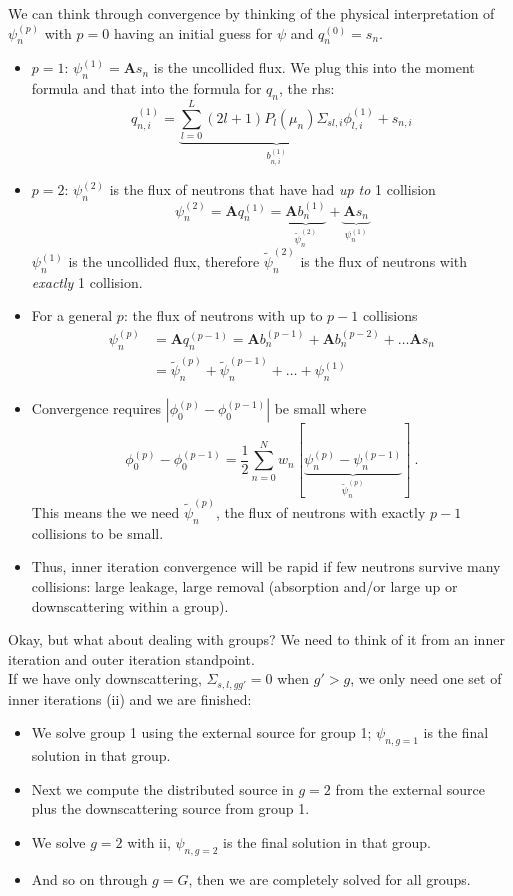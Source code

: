 \documentclass[12pt]{article}
\newcommand{\ve}[1]{\ensuremath{\mathbf{#1}}}
\begin{document}
We can think through convergence by thinking of the physical interpretation of $\psi_n^{(p)}$ with $p=0$ having an initial guess for $\psi$ and $q_n^{(0)} = s_n$.
\begin{itemize}
\item $p=1$: $\psi_n^{(1)} = \ve{A} s_n$ is the uncollided flux. We plug this into the moment formula and that into the formula for $q_n$, the rhs:
\[
q_{n,i}^{(1)} = \underbrace{\sum_{l=0}^L (2l+1) P_l(\mu_n) \Sigma_{sl,i} \phi_{l,i}^{(1)}}_{b_{n,i}^{(1)}} + s_{n,i}
\]

\item  $p=2$: $\psi_n^{(2)}$ is the flux of neutrons that have had \textit{up to} 1 collision
\[
\psi_n^{(2)} = \ve{A} q_{n}^{(1)} = \underbrace{\ve{A} b_n^{(1)}}_{\tilde{\psi}_n^{(2)}} + \underbrace{\ve{A}s_n}_{\psi_n^{(1)}}
\]
$\psi_n^{(1)}$ is the uncollided flux, therefore $\tilde{\psi}_n^{(2)}$ is the flux of neutrons with \textit{exactly} 1 collision.

\item For a general $p$: the flux of neutrons with up to $p-1$ collisions
\begin{align*}
\psi_n^{(p)} &= \ve{A} q_{n}^{(p-1)} = \ve{A} b_n^{(p-1)} + \ve{A} b_n^{(p-2)} + \dots \ve{A}s_n\\
&= \tilde{\psi}_n^{(p)} + \tilde{\psi}_n^{(p-1)} + \dots + \psi_n^{(1)}
\end{align*}

\item Convergence requires $|\phi_0^{(p)} - \phi_0^{(p-1)}|$ be small where
\[
\phi_0^{(p)} - \phi_0^{(p-1)} = \frac{1}{2} \sum_{n=0}^N w_n[\underbrace{\psi_n^{(p)} - \psi_n^{(p-1)}}_{\tilde{\psi}_n^{(p)}}] \:.
\]
This means the we need $\tilde{\psi}_n^{(p)}$, the flux of neutrons with exactly $p-1$ collisions to be small.

\item Thus, inner iteration convergence will be rapid if few neutrons survive many collisions: large leakage, large removal (absorption and/or large up or downscattering within a group).
\end{itemize}
%
Okay, but what about dealing with groups? We need to think of it from an inner iteration and outer iteration standpoint.\\
If we have only downscattering, $\Sigma_{s,l,gg'}=0$ when $g' > g$, we only need one set of inner iterations (ii) and we are finished:
% 
\begin{itemize}
\item We solve group 1 using the external source for group 1; $\psi_{n,g=1}$ is the final solution in that group. 
\item Next we compute the distributed source in $g=2$ from the external source plus the downscattering source from group 1. 
\item We solve $g=2$ with ii, $\psi_{n,g=2}$ is the final solution in that group.
\item And so on through $g=G$, then we are completely solved for all groups.
\end{itemize}
\end{document}
